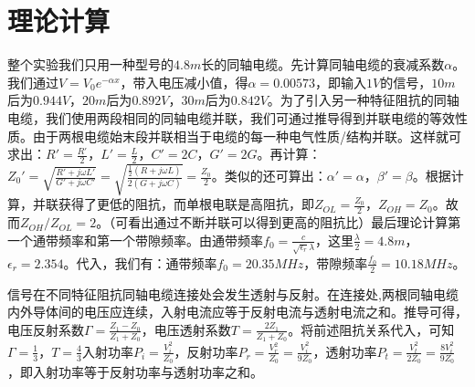 \documentclass[fleqn,10pt]{SelfArx} %
\affiliation{} %
\begin{document}
\maketitle %

\tableofcontents %

\thispagestyle{empty} %


\section{理论计算} %

整个实验我们只用一种型号的$4.8m$长的同轴电缆。先计算同轴电缆的衰减系数$\alpha$。我们通过$V=V_0e^{-\alpha x}$，带入电压减小值，得$\alpha=0.00573$，即输入$1V$的信号，$10m$后为$0.944V$，$20m$后为$0.892V$，$30m$后为$0.842V$。为了引入另一种特征阻抗的同轴电缆，我们使用两段相同的同轴电缆并联，我们可通过推导得到并联电缆的等效性质。由于两根电缆始末段并联相当于电缆的每一种电气性质/结构并联。这样就可求出：$R'=\frac{R'}{2}$，$L'=\frac{L}{2}$，$C'=2C$，$G'=2G$。再计算：$Z_0'=\sqrt{\frac{R'+j\omega L'}{G'+j\omega C'}}=\sqrt{\frac{\frac{1}{2}(R+j\omega L)}{2(G+j\omega C)}}=\frac{Z_0}{2}$。类似的还可算出：$\alpha'=\alpha$，$\beta'=\beta$。根据计算，并联获得了更低的阻抗，而单根电联是高阻抗，即$Z_{OL}=\frac{Z_0}{2}$，$Z_{OH}=Z_0$。故而$Z_{OH}/Z_{OL}=2$。（可看出通过不断并联可以得到更高的阻抗比）最后理论计算第一个通带频率和第一个带隙频率。由通带频率$f_0=\frac{c}{\sqrt{\epsilon_r}\lambda}$，这里$\frac{\lambda}{2}=4.8m$，$\epsilon_r= 2.354$。代入，我们有：通带频率$f_0=20.35MHz$，带隙频率$\frac{f_0}{2}=10.18MHz$。

信号在不同特征阻抗同轴电缆连接处会发生透射与反射。在连接处,两根同轴电缆内外导体间的电压应连续，入射电流应等于反射电流与透射电流之和。推导可得，电压反射系数$\Gamma=\frac{Z_1-Z_0}{Z_1+Z_0}$，电压透射系数$T=\frac{2Z_1}{Z_1+Z_0}$。将前述阻抗关系代入，可知$\Gamma=\frac{1}{3}$，$T=\frac{4}{3}$入射功率$P_i=\frac{V_i^2}{Z_0}$，反射功率$P_r=\frac{V_r^2}{Z_0}=\frac{V_i^2}{9Z_0}$，透射功率$P_t=\frac{V_t^2}{2Z_0}=\frac{8V_i^2}{9Z_0}$，即入射功率等于反射功率与透射功率之和。
\end{document}
